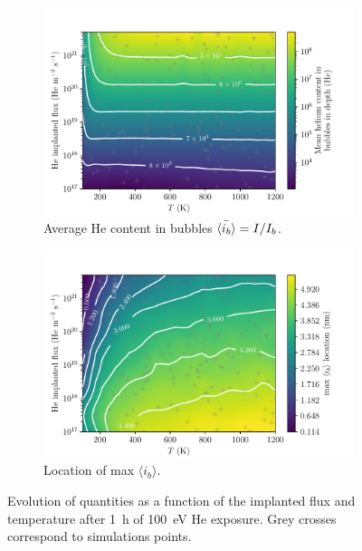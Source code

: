 \begin{figure} [ht!]
    \begin{subfigure}{0.5\linewidth}
        \centering
        \includegraphics[width=\linewidth]{Figures/Chapter4/parametric study/mean_ib_T_phi.pdf}
        \caption{Average \gls{He} content in bubbles $\Bar{\langle i_b \rangle} = I / I_b$.}
    \end{subfigure}%
    \begin{subfigure}{0.5\linewidth}
        \centering
        \includegraphics[width=\linewidth]{Figures/Chapter4/parametric study/x_max_ib_T_phi.pdf}
        \caption{Location of max $\langle i_b \rangle$.}
    \end{subfigure}
    \caption{Evolution of quantities as a function of the implanted flux and temperature after \SI{1}{h} of \SI{100}{eV} \gls{He} exposure. Grey crosses correspond to simulations points.}
\end{figure}

